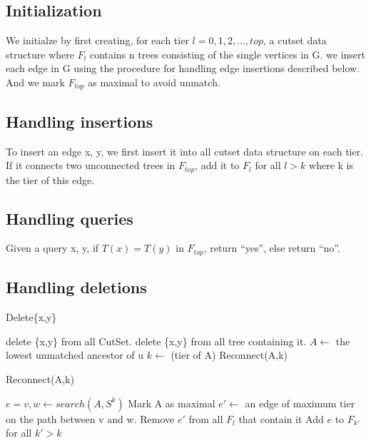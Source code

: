\documentclass[conference,compsoc]{IEEEtran}
\begin{document}
\subsection{Initialization}
We initialze by first creating, for each tier $l = 0, 1,2, \dots , top$, a cutset data structure where $F_l$ contains n trees consisting of the single vertices in G. we insert each edge in G using the procedure for handling edge insertions described below. And we mark $F_{top}$ as maximal to avoid unmatch.
\subsection{Handling insertions}
To insert an edge {x, y}, we first insert it into all cutset data structure on each tier. If it connects two unconnected trees in $F_{top}$, add it to $F_l$ for all $l > k$ where k is the tier of this edge.
\subsection{Handling queries}
Given a query {x, y}, if $T(x) = T(y)$ in $F_{top}$, return “yes”, else return “no”.
\subsection{Handling deletions}
\begin{algorithm}[H]
\caption{Delete\{x,y\}}
\begin{algorithmic}[1]
\State delete \{x,y\} from all CutSet.
\State delete \{x,y\} from all tree containing it.
			\State $A \gets$ the lowest unmatched ancestor of u
			\State $k \gets$ (tier of A)
			\State Reconnect(A,k)
		\EndWhile
	\EndFor


\end{algorithmic}
\end{algorithm}
\begin{algorithm}
\caption{Reconnect(A,k)}
\begin{algorithmic}[1]
\State $e = {v,w} \gets search(A,S^k)$
		\State Mark A as maximal
	\Else
			\State $e' \gets$ an edge of maximum tier on the path between v and w.
			\State Remove $e'$ from all $F_l$ that contain it
		\EndIf
		\State Add $e$ to $F_{k'}$ for all $k' > k$
	\EndIf


\end{algorithmic}

\end{algorithm}
\end{document}
